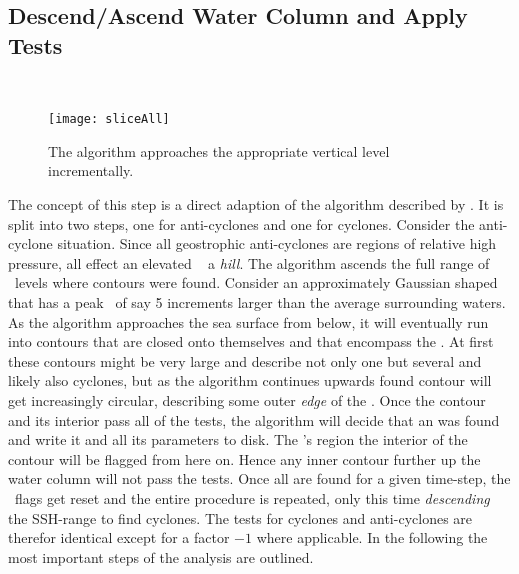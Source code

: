 \subsection{Descend/Ascend Water Column and Apply Tests}
 \\
\begin{figure}
	\texttt{[image: sliceAll]}
	\caption{The algorithm approaches the appropriate vertical level incrementally.}
	\label{fig:sliceAll}
\end{figure}
The concept of this step is a direct adaption of the algorithm described
by \citet{Chelton2011}. It is split into two steps, one for anti-cyclones and one
for cyclones. Consider \eg the anti-cyclone situation. Since all
geostrophic anti-cyclones are regions of relative high pressure, all
\ACs effect an elevated \SSH~\ie
a \textit{hill}. The algorithm ascends the full range of \SSH~levels where
contours were found. Consider an approximately Gaussian shaped \AC that has a
peak \SSH~of say 5 increments larger than the average surrounding waters.
As the algorithm approaches the sea surface from below, it will eventually run
into contours that are closed onto themselves and that encompass the \AC. At
first these contours might be very large and describe not only one but several
\ACs and likely also cyclones, but as the algorithm continues upwards found
contour will get increasingly circular, describing some outer \textit{edge} of
the \AC. Once the contour and its interior pass all of the tests, the algorithm
will decide that an \AC was found and write it and all its parameters to disk.
The \AC's region \ie the interior of the contour will be flagged from here on.
Hence any inner contour further up the water column will not pass the tests.
Once all \ACs are found for a given time-step, the \SSH~flags get reset and the
entire procedure is repeated, only this time \textit{descending} the SSH-range to
find cyclones. The tests for cyclones and anti-cyclones are therefor identical except for
a factor $-1$ where applicable. In the following the most important steps of the
analysis are
outlined.


